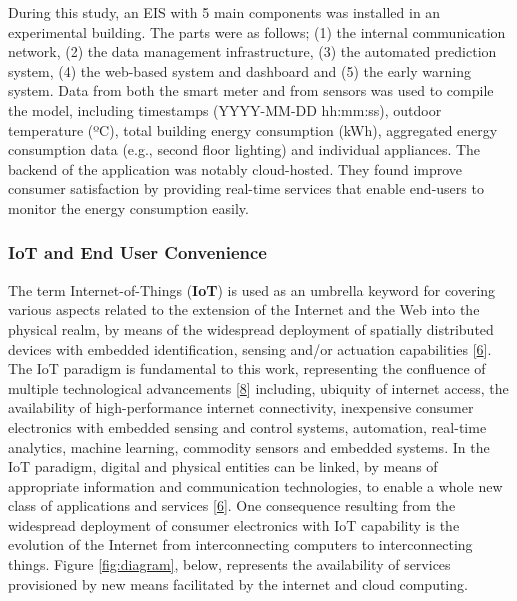 \documentclass[11pt,]{article}
\begin{document}
During this study, an EIS with 5 main components was installed in an
experimental building. The parts were as follows; (1) the internal
communication network, (2) the data management infrastructure, (3) the
automated prediction system, (4) the web-based system and dashboard and
(5) the early warning system. Data from both the smart meter and from
sensors was used to compile the model, including timestamps (YYYY-MM-DD
hh:mm:ss), outdoor temperature (ºC), total building energy consumption
(kWh), aggregated energy consumption data (e.g., second floor lighting)
and individual appliances. The backend of the application was notably
cloud-hosted. They found improve consumer satisfaction by providing
real-time services that enable end-users to monitor the energy
consumption easily.

\hypertarget{iot-and-end-user-convenience}{%
\subsubsection{IoT and End User
Convenience}\label{iot-and-end-user-convenience}}

The term Internet-of-Things (\textbf{IoT}) is used as an umbrella
keyword for covering various aspects related to the extension of the
Internet and the Web into the physical realm, by means of the widespread
deployment of spatially distributed devices with embedded
identification, sensing and/or actuation capabilities
{[}\protect\hyperlink{ref-danielemiorandiInternetThingsVision2012}{6}{]}.
The IoT paradigm is fundamental to this work, representing the
confluence of multiple technological advancements
{[}\protect\hyperlink{ref-luigiatzoriInternetThingsSurvey2010}{8}{]}
including, ubiquity of internet access, the availability of
high-performance internet connectivity, inexpensive consumer electronics
with embedded sensing and control systems, automation, real-time
analytics, machine learning, commodity sensors and embedded systems. In
the IoT paradigm, digital and physical entities can be linked, by means
of appropriate information and communication technologies, to enable a
whole new class of applications and services
{[}\protect\hyperlink{ref-danielemiorandiInternetThingsVision2012}{6}{]}.
One consequence resulting from the widespread deployment of consumer
electronics with IoT capability is the evolution of the Internet from
interconnecting computers to interconnecting things. Figure
\ref{fig:diagram}, below, represents the availability of services
provisioned by new means facilitated by the internet and cloud
computing.
\end{document}
